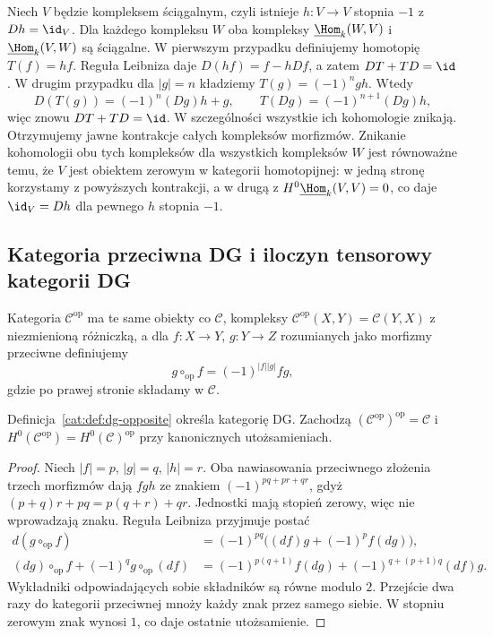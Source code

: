 \begin{przyklad}\label{cat:ex:dg-contractible}
Niech $V$ będzie kompleksem ściągalnym, czyli istnieje $h:V\to V$ stopnia $-1$ z $Dh=\id_V$. Dla każdego kompleksu $W$ oba kompleksy $\underline{\Hom}_k(W,V)$ i $\underline{\Hom}_k(V,W)$ są ściągalne. W pierwszym przypadku definiujemy homotopię $T(f)=hf$. Reguła Leibniza daje $D(hf)=f-hDf$, a zatem $DT+TD=\id$. W drugim przypadku dla $|g|=n$ kładziemy $T(g)=(-1)^ngh$. Wtedy
\[
 D(T(g))=(-1)^n(Dg)h+g,\qquad
 T(Dg)=(-1)^{n+1}(Dg)h,
\]
więc znowu $DT+TD=\id$. W szczególności wszystkie ich kohomologie znikają. Otrzymujemy jawne kontrakcje całych kompleksów morfizmów. Znikanie kohomologii obu tych kompleksów dla wszystkich kompleksów $W$ jest równoważne temu, że $V$ jest obiektem zerowym w kategorii homotopijnej: w jedną stronę korzystamy z powyższych kontrakcji, a w drugą z $H^0\underline{\Hom}_k(V,V)=0$, co daje $\id_V=Dh$ dla pewnego $h$ stopnia $-1$.
\end{przyklad}

\subsection{Kategoria przeciwna DG i iloczyn tensorowy kategorii DG}

\begin{definicja}\label{cat:def:dg-opposite}
Kategoria $\mathcal C^{\mathrm{op}}$ ma te same obiekty co $\mathcal C$, kompleksy $\mathcal C^{\mathrm{op}}(X,Y)=\mathcal C(Y,X)$ z niezmienioną różniczką, a dla $f:X\to Y$, $g:Y\to Z$ rozumianych jako morfizmy przeciwne definiujemy
\[
 g\circ_{\mathrm{op}} f=(-1)^{|f||g|}fg,
\]
gdzie po prawej stronie składamy w $\mathcal C$.
\end{definicja}

\begin{stwierdzenie}\label{cat:prop:dg-opposite}
Definicja~\ref{cat:def:dg-opposite} określa kategorię DG. Zachodzą $(\mathcal C^{\mathrm{op}})^{\mathrm{op}}=\mathcal C$ i $H^0(\mathcal C^{\mathrm{op}})=H^0(\mathcal C)^{\mathrm{op}}$ przy kanonicznych utożsamieniach.
\end{stwierdzenie}
\begin{proof}
Niech $|f|=p$, $|g|=q$, $|h|=r$. Oba nawiasowania przeciwnego złożenia trzech morfizmów dają $fgh$ ze znakiem $(-1)^{pq+pr+qr}$, gdyż $(p+q)r+pq=p(q+r)+qr$. Jednostki mają stopień zerowy, więc nie wprowadzają znaku. Reguła Leibniza przyjmuje postać
\[
\begin{aligned}
 d(g\circ_{\mathrm{op}}f)
 &=(-1)^{pq}\bigl((df)g+(-1)^pf(dg)\bigr),\\
 (dg)\circ_{\mathrm{op}}f+(-1)^qg\circ_{\mathrm{op}}(df)
 &=(-1)^{p(q+1)}f(dg)
 +(-1)^{q+(p+1)q}(df)g.
\end{aligned}
\]
Wykładniki odpowiadających sobie składników są równe modulo $2$. Przejście dwa razy do kategorii przeciwnej mnoży każdy znak przez samego siebie. W stopniu zerowym znak wynosi $1$, co daje ostatnie utożsamienie.
\end{proof}

